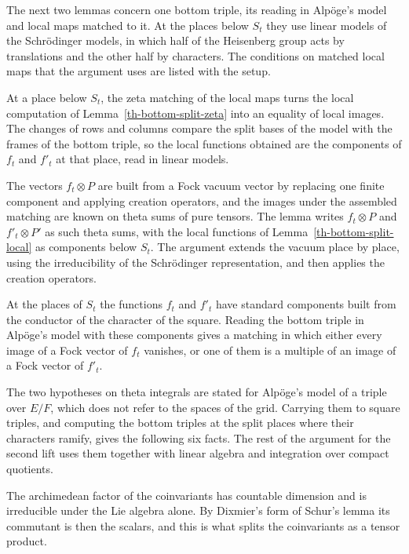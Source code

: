 The next two lemmas concern one bottom triple, its reading in Alpöge's model
and local maps matched to it. At the places below $S_t$ they use linear models
of the Schrödinger models, in which half of the Heisenberg group acts by
translations and the other half by characters. The conditions on matched local
maps that the argument uses are listed with the setup.

At a place below $S_t$, the zeta matching of the local maps turns the local
computation of Lemma~\ref{th-bottom-split-zeta} into an equality of local
images. The changes of rows and columns compare the split bases of the model
with the frames of the bottom triple, so the local functions obtained are the
components of $f_t$ and $f'_t$ at that place, read in linear models.

The vectors $f_t\otimes P$ are built from a Fock vacuum vector by replacing
one finite component and applying creation operators, and the images under the
assembled matching are known on theta sums of pure tensors. The lemma writes
$f_t\otimes P$ and $f'_t\otimes P'$ as such theta sums, with the local
functions of Lemma~\ref{th-bottom-split-local} as components below $S_t$. The
argument extends the vacuum place by place, using the irreducibility of the
Schrödinger representation, and then applies the creation operators.

At the places of $S_t$ the functions $f_t$ and $f'_t$ have standard
components built from the conductor of the character of the square. Reading
the bottom triple in Alpöge's model with these components gives a matching in
which either every image of a Fock vector of $f_t$ vanishes, or one of them is
a multiple of an image of a Fock vector of $f'_t$.

The two hypotheses on theta integrals are stated for Alpöge's model of a
triple over $E/F$, which does not refer to the spaces of the grid. Carrying
them to square triples, and computing the bottom triples at the split places
where their characters ramify, gives the following six facts. The rest of the
argument for the second lift uses them together with linear algebra and
integration over compact quotients.

The archimedean factor of the coinvariants has countable dimension and is
irreducible under the Lie algebra alone. By Dixmier's form of Schur's lemma
its commutant is then the scalars, and this is what splits the coinvariants
as a tensor product.

